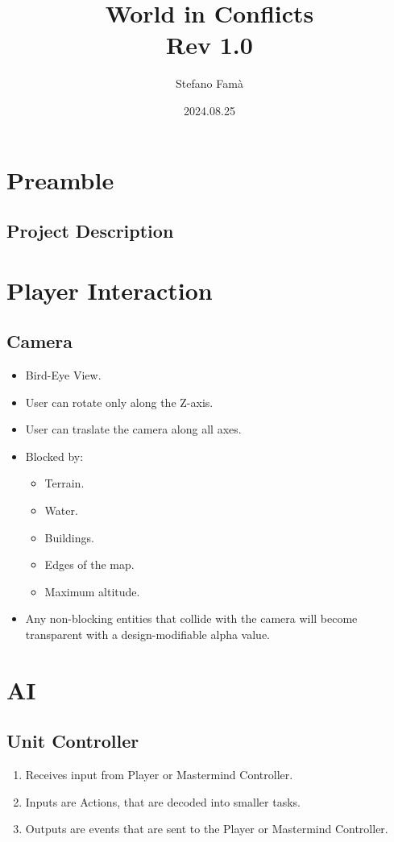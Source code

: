 \documentclass[12pt]{report}
\title{World in Conflicts\\\normalsize{Rev 1.0}}
\author{Stefano Fam\`a}
\date{2024.08.25}
\begin{document}
\maketitle
\tableofcontents
\newpage

\chapter{Preamble}
\section{Project Description}

\chapter{Player Interaction}
\section{Camera}
\begin{itemize}
\item Bird-Eye View.
\item User can rotate only along the Z-axis.
\item User can traslate the camera along all axes.
\item Blocked by:
	\begin{itemize}
	\item Terrain.
	\item Water.
	\item Buildings.
	\item Edges of the map.
	\item Maximum altitude.
	\end{itemize}
\item Any non-blocking entities that collide with the camera will become transparent with a design-modifiable alpha value.
\end{itemize}

\chapter{AI}
\section{Unit Controller}
\begin{enumerate}
\item Receives input from Player or Mastermind Controller.
\item Inputs are Actions, that are decoded into smaller tasks.
\item Outputs are events that are sent to the Player or Mastermind Controller.
\end{enumerate}
\end{document}
